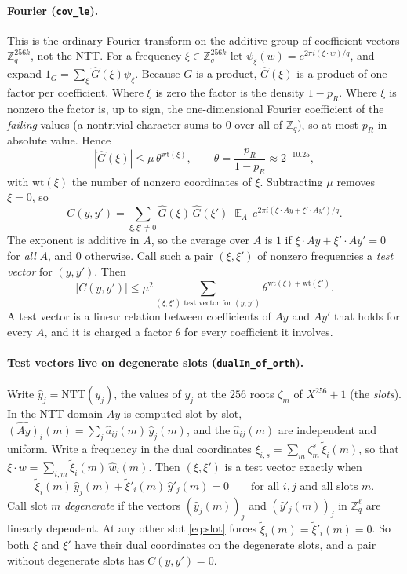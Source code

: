 \documentclass[11pt]{article}
\theoremstyle{definition}
\theoremstyle{remark}
\newcommand{\Z}{\mathbb{Z}}
\newcommand{\lean}[1]{\texttt{#1}}
\begin{document}
\paragraph{Fourier (\lean{cov\_le}).}
This is the ordinary Fourier transform on the additive group of coefficient vectors
$\Z_q^{256k}$, not the NTT. For a frequency $\xi\in\Z_q^{256k}$ let
$\psi_\xi(w) = e^{2\pi i(\xi\cdot w)/q}$, and expand
$1_G = \sum_\xi \hat G(\xi)\psi_\xi$. Because $G$ is a product, $\hat G(\xi)$ is a product of one
factor per coefficient. Where $\xi$ is zero the factor is the density $1-p_R$. Where $\xi$ is
nonzero the factor is, up to sign, the one-dimensional Fourier coefficient of the \emph{failing}
values (a nontrivial character sums to $0$ over all of $\Z_q$), so at most $p_R$ in absolute
value. Hence
\[
  |\hat G(\xi)| \le \mu\,\theta^{\mathrm{wt}(\xi)},\qquad
  \theta = \frac{p_R}{1-p_R} \approx 2^{-10.25},
\]
with $\mathrm{wt}(\xi)$ the number of nonzero coordinates of $\xi$. Subtracting $\mu$ removes
$\xi = 0$, so
\[
  C(y,y') = \sum_{\xi,\xi'\ne0}\hat G(\xi)\,\hat G(\xi')\;
  \mathop{\mathbb E}_A\,e^{2\pi i(\xi\cdot Ay+\xi'\cdot Ay')/q}.
\]
The exponent is additive in $A$, so the
average over $A$ is $1$ if $\xi\cdot Ay + \xi'\cdot Ay' = 0$ for \emph{all} $A$, and $0$
otherwise. Call such a pair $(\xi,\xi')$ of nonzero frequencies a \emph{test vector} for
$(y,y')$. Then
\[
  |C(y,y')|
  \le \mu^2 \!\!\sum_{(\xi,\xi')\text{ test vector for }(y,y')}\!\!
      \theta^{\mathrm{wt}(\xi) + \mathrm{wt}(\xi')}.
\]
A test vector is a linear relation between coefficients of $Ay$ and $Ay'$ that holds for every
$A$, and it is charged a factor $\theta$ for every coefficient it involves.

\paragraph{Test vectors live on degenerate slots (\lean{dualIn\_of\_orth}).}
Write $\hat y_j = \mathrm{NTT}(y_j)$, the values of $y_j$ at the $256$ roots $\zeta_m$ of
$X^{256}+1$ (the \emph{slots}). In the NTT domain $Ay$ is computed slot by slot,
$\widehat{(Ay)}_i(m) = \sum_j \hat a_{ij}(m)\,\hat y_j(m)$, and the $\hat a_{ij}(m)$ are
independent and uniform. Write a frequency in the dual coordinates
$\xi_{i,s} = \sum_m \zeta_m^s\,\tilde\xi_i(m)$, so that
$\xi\cdot w = \sum_{i,m}\tilde\xi_i(m)\,\hat w_i(m)$. Then $(\xi,\xi')$ is a test vector exactly
when
\begin{equation}\label{eq:slot}
  \tilde\xi_i(m)\,\hat y_j(m) + \tilde\xi'_i(m)\,\hat y'_j(m) = 0
  \qquad\text{for all } i, j \text{ and all slots } m.
\end{equation}
Call slot $m$ \emph{degenerate} if the vectors $(\hat y_j(m))_j$ and $(\hat y'_j(m))_j$ in
$\Z_q^\ell$ are linearly dependent. At any other slot \eqref{eq:slot} forces
$\tilde\xi_i(m) = \tilde\xi'_i(m) = 0$. So both $\xi$ and $\xi'$ have their dual coordinates on
the degenerate slots, and a pair without degenerate slots has $C(y,y') = 0$.
\end{document}
